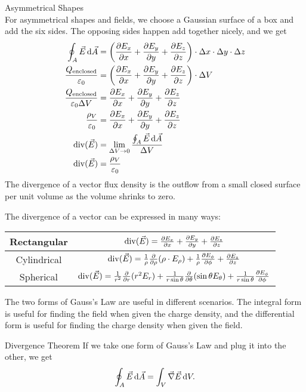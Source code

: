 \documentclass[class=article, crop=false]{standalone}
\begin{document}
  \begin{example}{Asymmetrical Shapes}\\
    For asymmetrical shapes and fields, we choose a Gaussian surface of a box and add the six sides. The opposing sides happen add together nicely, and we get
    \begin{align*}
      \oint_A \vec{E}\,\mathrm{d}\vec{A} &= \left( \frac{\partial E_x}{\partial x}+\frac{\partial E_y}{\partial y}+\frac{\partial E_z}{\partial z} \right)\cdot \Delta x\cdot \Delta y\cdot \Delta z \\
      \frac{Q_{\text{enclosed}}}{\varepsilon_0} &= \left( \frac{\partial E_x}{\partial x}+\frac{\partial E_y}{\partial y}+\frac{\partial E_z}{\partial z} \right)\cdot \Delta V \\
      \frac{Q_{\text{enclosed}}}{\varepsilon_0\Delta V} &= \frac{\partial E_x}{\partial x}+\frac{\partial E_y}{\partial y}+\frac{\partial E_z}{\partial z} \\
      \frac{\rho_V}{\varepsilon_0} &= \frac{\partial E_x}{\partial x}+\frac{\partial E_y}{\partial y}+ \frac{\partial E_z}{\partial z} \\
      \operatorname{div}(\vec{E}) &= \lim_{\Delta V\to 0} \frac{\oint_A \vec{E}\,\mathrm{d}\vec{A}}{\Delta V} \\
      \operatorname{div}(\vec{E}) &= \frac{\rho_V}{\varepsilon_0}
    \end{align*}
    The divergence of a vector flux density is the outflow from a small closed surface per unit volume as the volume shrinks to zero.
  \end{example}
  The divergence of a vector can be expressed in many ways:
  \begin{center}\begin{tabular}{c|c}
    Rectangular & $\operatorname{div}(\vec{E}) = \frac{\partial E_x}{\partial x}+\frac{\partial E_y}{\partial y}+ \frac{\partial E_z}{\partial z}$ \\
    \hline
    Cylindrical & $\operatorname{div}(\vec{E}) = \frac{1}{\rho}\frac{\partial}{\partial\rho}(\rho\cdot E_\rho) + \frac{1}{\rho}\frac{\partial E_\phi}{\partial \phi} + \frac{\partial E_z}{\partial z}$ \\
    \hline
    Spherical & $\operatorname{div}(\vec{E}) = \frac{1}{r^2}\frac{\partial}{\partial r}(r^2E_r) + \frac{1}{r\sin\theta}\frac{\partial}{\partial\theta}(\sin\theta E_\theta) + \frac{1}{r\sin\theta}\frac{\partial E_\phi}{\partial\phi}$
  \end{tabular}\end{center}
  The two forms of Gauss's Law are useful in different scenarios. The integral form is useful for finding the field when given the charge density, and the differential form is useful for finding the charge density when given the field.
  \begin{theorem}{Divergence Theorem}
    If we take one form of Gauss's Law and plug it into the other, we get
    \[
      \oint_A \vec{E}\,\mathrm{d}\vec{A} = \int_{V} \vec{\nabla}\vec{E} \,\mathrm{d}V.
    \]
  \end{theorem}
\end{document}
